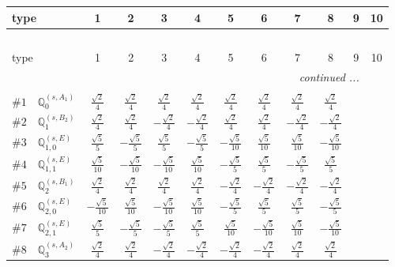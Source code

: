 \documentclass[fleqn,9pt,landscape]{jsarticle}
\begin{document}
\begin{center}
\renewcommand{\arraystretch}{1.3}
\begin{longtable}{lcccccccccc}
 \hline \hline
type & 1 & 2 & 3 & 4 & 5 & 6 & 7 & 8 & 9 & 10 \\ \hline \endfirsthead

\multicolumn{10}{l}{\tablename\ \thetable{}} \\
 \hline \hline
type & 1 & 2 & 3 & 4 & 5 & 6 & 7 & 8 & 9 & 10 \\ \hline \endhead

 \hline \hline
\multicolumn{10}{r}{\footnotesize\it continued ...} \\ \endfoot

 \hline \hline
\multicolumn{10}{r}{} \\ \endlastfoot

$ \#1\quad \mathbb{Q}_{0}^{(s,A_{1})} $ & $ \frac{\sqrt{2}}{4} $ & $ \frac{\sqrt{2}}{4} $ & $ \frac{\sqrt{2}}{4} $ & $ \frac{\sqrt{2}}{4} $ & $ \frac{\sqrt{2}}{4} $ & $ \frac{\sqrt{2}}{4} $ & $ \frac{\sqrt{2}}{4} $ & $ \frac{\sqrt{2}}{4} $ \\ \hline
$ \#2\quad \mathbb{Q}_{1}^{(s,B_{2})} $ & $ \frac{\sqrt{2}}{4} $ & $ \frac{\sqrt{2}}{4} $ & $ - \frac{\sqrt{2}}{4} $ & $ - \frac{\sqrt{2}}{4} $ & $ \frac{\sqrt{2}}{4} $ & $ \frac{\sqrt{2}}{4} $ & $ - \frac{\sqrt{2}}{4} $ & $ - \frac{\sqrt{2}}{4} $ \\ \hline
$ \#3\quad \mathbb{Q}_{1,0}^{(s,E)} $ & $ \frac{\sqrt{5}}{5} $ & $ - \frac{\sqrt{5}}{5} $ & $ \frac{\sqrt{5}}{5} $ & $ - \frac{\sqrt{5}}{5} $ & $ - \frac{\sqrt{5}}{10} $ & $ \frac{\sqrt{5}}{10} $ & $ \frac{\sqrt{5}}{10} $ & $ - \frac{\sqrt{5}}{10} $ \\ \hline
$ \#4\quad \mathbb{Q}_{1,1}^{(s,E)} $ & $ \frac{\sqrt{5}}{10} $ & $ - \frac{\sqrt{5}}{10} $ & $ - \frac{\sqrt{5}}{10} $ & $ \frac{\sqrt{5}}{10} $ & $ - \frac{\sqrt{5}}{5} $ & $ \frac{\sqrt{5}}{5} $ & $ - \frac{\sqrt{5}}{5} $ & $ \frac{\sqrt{5}}{5} $ \\ \hline
$ \#5\quad \mathbb{Q}_{2}^{(s,B_{1})} $ & $ \frac{\sqrt{2}}{4} $ & $ \frac{\sqrt{2}}{4} $ & $ \frac{\sqrt{2}}{4} $ & $ \frac{\sqrt{2}}{4} $ & $ - \frac{\sqrt{2}}{4} $ & $ - \frac{\sqrt{2}}{4} $ & $ - \frac{\sqrt{2}}{4} $ & $ - \frac{\sqrt{2}}{4} $ \\ \hline
$ \#6\quad \mathbb{Q}_{2,0}^{(s,E)} $ & $ - \frac{\sqrt{5}}{10} $ & $ \frac{\sqrt{5}}{10} $ & $ - \frac{\sqrt{5}}{10} $ & $ \frac{\sqrt{5}}{10} $ & $ - \frac{\sqrt{5}}{5} $ & $ \frac{\sqrt{5}}{5} $ & $ \frac{\sqrt{5}}{5} $ & $ - \frac{\sqrt{5}}{5} $ \\ \hline
$ \#7\quad \mathbb{Q}_{2,1}^{(s,E)} $ & $ \frac{\sqrt{5}}{5} $ & $ - \frac{\sqrt{5}}{5} $ & $ - \frac{\sqrt{5}}{5} $ & $ \frac{\sqrt{5}}{5} $ & $ \frac{\sqrt{5}}{10} $ & $ - \frac{\sqrt{5}}{10} $ & $ \frac{\sqrt{5}}{10} $ & $ - \frac{\sqrt{5}}{10} $ \\ \hline
$ \#8\quad \mathbb{Q}_{3}^{(s,A_{2})} $ & $ \frac{\sqrt{2}}{4} $ & $ \frac{\sqrt{2}}{4} $ & $ - \frac{\sqrt{2}}{4} $ & $ - \frac{\sqrt{2}}{4} $ & $ - \frac{\sqrt{2}}{4} $ & $ - \frac{\sqrt{2}}{4} $ & $ \frac{\sqrt{2}}{4} $ & $ \frac{\sqrt{2}}{4} $ \\
\end{longtable}
\end{center}
\end{document}
